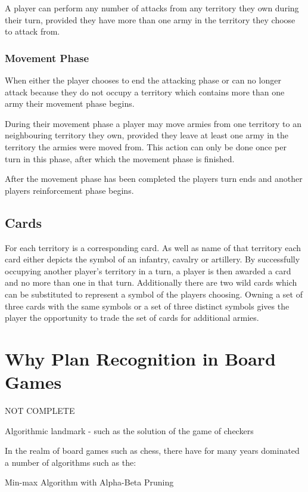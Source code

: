 \documentclass[parskip]{cs4rep}
\begin{document}
A player can perform any number of attacks from any territory they own during their turn, provided they have more than one army in the territory they choose to attack from.

\subsubsection{Movement Phase}

When either the player chooses to end the attacking phase or can no longer attack because they do not occupy a territory which contains more than one army their movement phase begins.

During their movement phase a player may move armies from one territory to an neighbouring territory they own, provided they leave at least one army in the territory the armies were moved from. This action can only be done once per turn in this phase, after which the movement phase is finished.

After the movement phase has been completed the players turn ends and another players reinforcement phase begins.
\newpage

\subsection{Cards}

For each territory is a corresponding card. As well as name of that territory each card either depicts the symbol of an infantry, cavalry or artillery. By successfully occupying another player's territory in a turn, a player is then awarded a card and no more than one in that turn. Additionally there are two wild cards which can be substituted to represent a symbol of the players choosing. Owning a set of three cards with the same symbols or a set of three distinct symbols gives the player the opportunity to trade the set of cards for additional armies.

\section{Why Plan Recognition in Board Games}

NOT COMPLETE

Algorithmic landmark - such as the solution of the game of checkers 

In the realm of board games such as chess, there have for many years dominated a number of algorithms such as the:

Min-max Algorithm with Alpha-Beta Pruning
\end{document}
